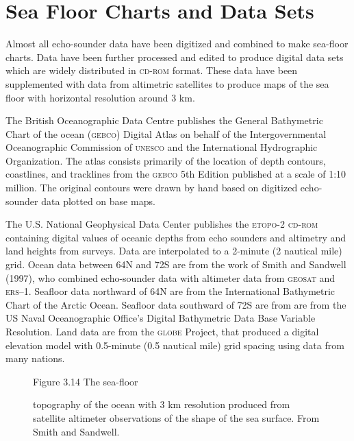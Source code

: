 \section{Sea Floor Charts and Data Sets}
Almost all echo-sounder data have been digitized and combined to make
sea-floor charts. Data have been further processed and edited to produce digital data
sets which are widely distributed in \textsc{cd-rom} format. These data have
been supplemented with data from altimetric satellites to produce
maps of the sea floor with horizontal resolution around 3 km.

The British Oceanographic Data Centre publishes the General Bathymetric Chart of
the ocean (\textsc{gebco}) Digital Atlas on behalf of the Intergovernmental Oceanographic Commission of \textsc{unesco} and the International Hydrographic
Organization. The atlas consists primarily of the location of depth
contours, coastlines, and tracklines from the \textsc{gebco} 5th Edition published at a scale of 1:10 million. The original contours were drawn by hand based on digitized echo-sounder data plotted on base maps.

The U.S. National Geophysical Data Center publishes the \textsc{etopo-2 cd-rom}
containing digital values of oceanic depths from echo sounders and altimetry and land
heights from surveys. Data are interpolated to a 2-minute (2 nautical mile)
grid. Ocean data between 64\degrees N and 72\degrees S are from the work of Smith and Sandwell (1997), who combined echo-sounder data with altimeter data from
\textsc{geosat} and \textsc{ers--1}. Seafloor data northward of 64\degrees N are from the International Bathymetric Chart of the Arctic Ocean.  Seafloor data southward of 72\degrees S are from are from the US Naval Oceanographic Office's Digital Bathymetric Data Base Variable Resolution. Land data are from the \textsc{globe} Project, that produced a digital elevation model with 0.5-minute (0.5 nautical mile) grid spacing using data from many nations. 

\begin{figure}[t!]
\centering
\footnotesize
Figure 3.14 The sea-floor \rule{0pt}{3ex}topography of the ocean with 3 km
resolution produced from satellite altimeter observations of the shape of the sea
surface. From Smith and Sandwell.

\label{fig:worlsbathym}
\vspace{-4ex}
\end{figure}

